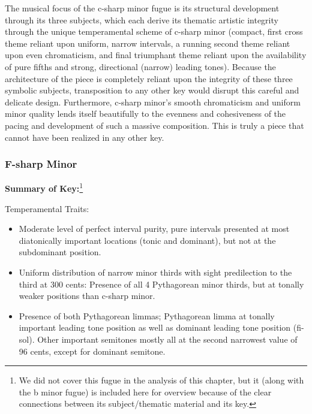 The musical focus of the c-sharp minor fugue is its structural
development through its three subjects, which each derive its thematic
artistic integrity through the unique temperamental scheme of c-sharp
minor (compact, first cross theme reliant upon uniform, narrow
intervals, a running second theme reliant upon even chromaticism, and
final triumphant theme reliant upon the availability of pure fifths and
strong, directional (narrow) leading tones). Because the architecture of
the piece is completely reliant upon the integrity of these three
symbolic subjects, transposition to any other key would disrupt this
careful and delicate design. Furthermore, c-sharp minor's smooth
chromaticism and uniform minor quality lends itself beautifully to the
evenness and cohesiveness of the pacing and development of such a
massive composition. This is truly a piece that cannot have been
realized in any other key.

    \subsubsection{F-sharp Minor}\label{f-sharp-minor}

\textbf{Summary of
Key:}\footnote{We did not cover this fugue in the analysis of this chapter, but it (along with the b minor fugue) is included here for overview because of the clear connections between its subject/thematic material and its key.}


    \begin{center}
    \end{center}
    
    Temperamental Traits:

\begin{itemize}
\tightlist
\item
  Moderate level of perfect interval purity, pure intervals presented at
  most diatonically important locations (tonic and dominant), but not at
  the subdominant position.
\item
  Uniform distribution of narrow minor thirds with sight predilection to
  the third at 300 cents: Presence of all 4 Pythagorean minor thirds,
  but at tonally weaker positions than c-sharp minor.
\item
  Presence of both Pythagorean limmas; Pythagorean limma at tonally
  important leading tone position as well as dominant leading tone
  position (fi-sol). Other important semitones mostly all at the second
  narrowest value of 96 cents, except for dominant semitone.
\end{itemize}

